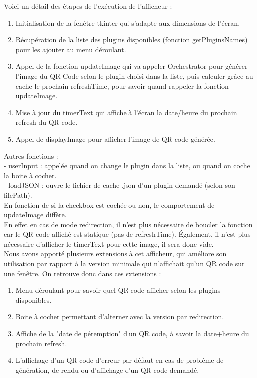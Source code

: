 \documentclass[a4paper,12pt]{article}
\begin{document}
Voici un détail des étapes de l'exécution de l'afficheur :
\begin{enumerate}
\item Initialisation de la fenêtre tkinter qui s'adapte aux dimensions de l'écran.
\item Récupération de la liste des plugins disponibles (fonction getPluginsNames) pour les ajouter au menu déroulant.
\item Appel de la fonction updateImage qui va appeler Orchestrator pour générer l'image du QR Code selon le plugin choisi dans la liste, puis calculer grâce au cache le prochain refreshTime, pour savoir quand rappeler la fonction updateImage.
\item Mise à jour du timerText qui affiche à l'écran la date/heure du prochain refresh du QR code.
\item Appel de displayImage pour afficher l'image de QR code générée.\\
\end{enumerate}
Autres fonctions :\\
- userInput : appelée quand on change le plugin dans la liste, ou quand on coche la boite à cocher.\\
- loadJSON : ouvre le fichier de cache .json d'un plugin demandé (selon son filePath).\\

\noindent En fonction de si la checkbox est cochée ou non, le comportement de updateImage diffère.\\
En effet en cas de mode redirection, il n'est plus nécessaire de boucler la fonction car le QR code affiché est statique (pas de refreshTime). Également, il n'est plus nécessaire d'afficher le timerText pour cette image, il sera donc vide.\\

\noindent Nous avons apporté plusieurs extensions à cet afficheur, qui améliore son utilisation par rapport à la version minimale qui n'affichait qu'un QR code sur une fenêtre. On retrouve donc dans ces extensions :

\begin{enumerate}
\item Menu déroulant pour savoir quel QR code afficher selon les plugins disponibles.
\item Boite à cocher permettant d'alterner avec la version par redirection.
\item Affiche de la "date de péremption" d'un QR code, à savoir la date+heure du prochain refresh.
\item L'affichage d'un QR code d'erreur par défaut en cas de problème de génération, de rendu ou d'affichage d'un QR code demandé. 
\end{enumerate}
\end{document}
